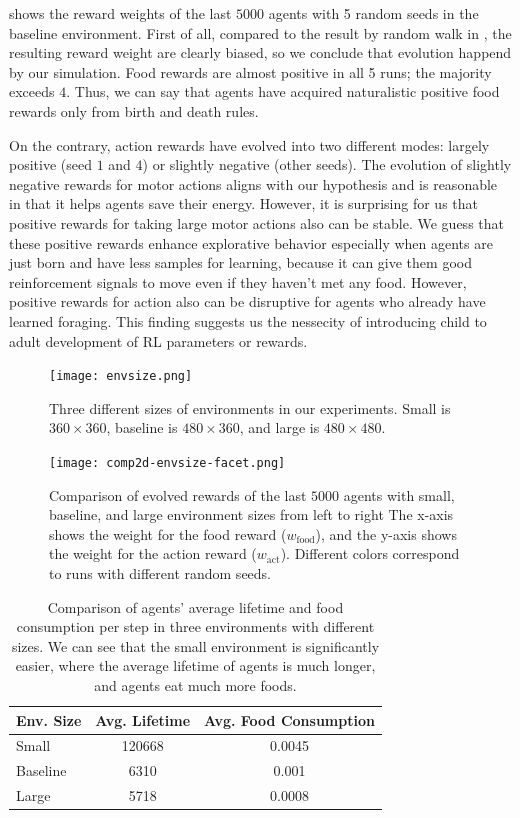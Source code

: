  shows the reward weights of the last $5000$ agents with 5 random seeds in the baseline environment. First of all, compared to the result by random walk in , the resulting reward weight are clearly biased, so we conclude that evolution happend by our simulation. Food rewards are almost positive in all 5 runs; the majority exceeds $4$. Thus, we can say that agents have acquired naturalistic positive food rewards only from birth and death rules.

On the contrary, action rewards have evolved into two different modes: largely positive (seed $1$ and $4$) or slightly negative (other seeds). The evolution of slightly negative rewards for motor actions aligns with our hypothesis and is reasonable in that it helps agents save their energy. However, it is surprising for us that positive rewards for taking large motor actions also can be stable. We guess that these positive rewards enhance explorative behavior especially when agents are just born and have less samples for learning, because it can give them good reinforcement signals to move even if they haven't met any food. However, positive rewards for action also can be disruptive for agents who already have learned foraging. This finding suggests us the nessecity of introducing child to adult development of RL parameters or rewards.

\begin{figure}[t]
  \centering
  \texttt{[image: envsize.png]}
  \caption{
    Three different sizes of environments in our experiments. Small is $360\times360$, baseline is $480\times360$, and large is $480\times480$.
  }\label{figure:envsize}
\end{figure}

\begin{figure}[t]
  \centering
  \texttt{[image: comp2d-envsize-facet.png]}
  \caption{
    Comparison of evolved rewards of the last $5000$ agents with small, baseline, and large environment sizes from left to right
    The x-axis shows the weight for the food reward ($w_{\mathrm{food}}$), and the y-axis shows the weight for the action reward ($w_{\mathrm{act}}$).
    Different colors correspond to runs with different random seeds.
  }\label{figure:result-envsize}
\end{figure}

\begin{table}[t]
    \centering
    \begin{tabular}{lcc}
      \toprule
      Env. Size &  Avg. Lifetime & Avg. Food Consumption \\
      \midrule
      Small &  120668 & 0.0045 \\
      Baseline & 6310 & 0.001 \\
      Large & 5718 & 0.0008 \\
      \bottomrule
    \end{tabular}
  \caption{
    Comparison of agents' average lifetime and food consumption per step in three environments with different sizes. We can see that the small environment is significantly easier, where the average lifetime of agents is much longer, and agents eat much more foods.
  }\label{table:envsize}
\end{table}

